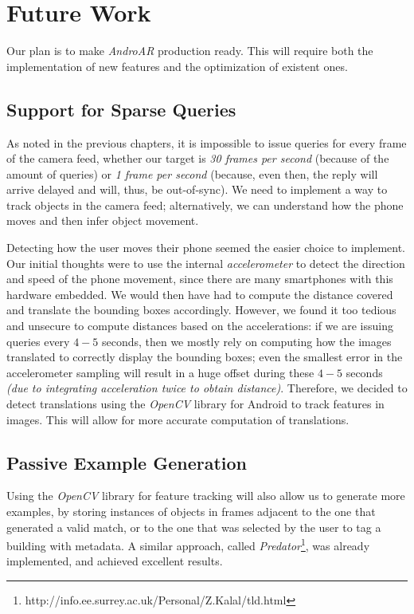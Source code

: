\documentclass[a4paper,onecolumn,oneside,titlepage,11pt]{report}
\begin{document}
\chapter{Future Work}
\label{chap:conclusions}
Our plan is to make \emph{AndroAR} production ready. This will require both the implementation of new features and the optimization of existent ones.

\section*{Support for Sparse Queries}
As noted in the previous chapters, it is impossible to issue queries for every frame of the camera feed, whether our target is \emph{30 frames per second} (because of the amount of queries) or \emph{1 frame per second} (because, even then, the reply will arrive delayed and will, thus, be out-of-sync). We need to implement a way to track objects in the camera feed; alternatively, we can understand how the phone moves and then infer object movement.

Detecting how the user moves their phone seemed the easier choice to implement. Our initial thoughts were to use the internal \emph{accelerometer} to detect the direction and speed of the phone movement, since there are many smartphones with this hardware embedded. We would then have had to compute the distance covered and translate the bounding boxes accordingly. However, we found it too tedious and unsecure to compute distances based on the accelerations: if we are issuing queries every $4-5$ seconds, then we mostly rely on computing how the images translated to correctly display the bounding boxes; even the smallest error in the accelerometer sampling will result in a huge offset during these $4-5$ seconds \emph{(due to integrating acceleration \emph{twice} to obtain distance)}. Therefore, we decided to detect translations using the \emph{OpenCV} library for Android to track features in images. This will allow for more accurate computation of translations.

\section*{Passive Example Generation}
Using the \emph{OpenCV} library for feature tracking will also allow us to generate more examples, by storing instances of objects in frames adjacent to the one that generated a valid match, or to the one that was selected by the user to tag a building with metadata. A similar approach, called \emph{Predator}\footnote{http://info.ee.surrey.ac.uk/Personal/Z.Kalal/tld.html}, was already implemented, and achieved excellent results.
\end{document}
